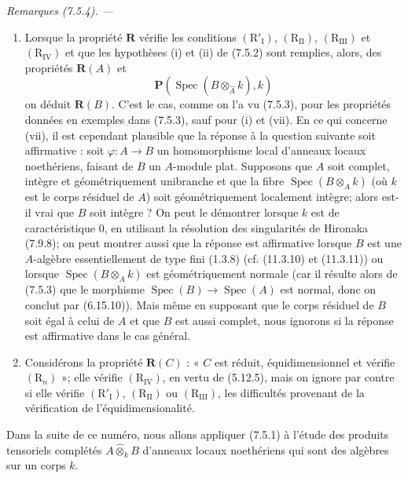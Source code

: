 \documentclass[10pt,oneside]{book}
\newcommand{\oldpage}[2][]{%
  \setcounter{footnote}{0}%
  \marginpar{\scriptsize\textbf{#1}~|~#2}\ignorespaces}
\newenvironment{remarks}[1][]{%
  \par\medskip\noindent\itshape Remarques (#1). ---\ }{\par}
\begin{document}
\begin{remarks}[7.5.4]
\begin{enumerate}
\item[\emph{(iii)}] Lorsque la propriété $\boldsymbol R$ vérifie les conditions
$(\mathrm R'_{\mathrm I})$, $(\mathrm R_{\mathrm{II}})$,
$(\mathrm R_{\mathrm{III}})$ et $(\mathrm R_{\mathrm{IV}})$ et que les
hypothèses (i) et (ii) de (7.5.2) sont remplies, alors, des propriétés
$\boldsymbol R(A)$ et
\[
\boldsymbol P(\operatorname{Spec}(\widehat B
\otimes_{\widehat A}k),k)
\]
on déduit $\boldsymbol R(B)$. C'est le cas, comme on l'a vu (7.5.3), pour les
propriétés données en exemples dans (7.5.3), sauf pour (i) et (vii). En ce qui
concerne (vii), il est cependant plausible que la réponse à la question
suivante soit affirmative : soit $\varphi:A\to B$ un homomorphisme local
d'anneaux locaux noethériens, faisant de $B$ un $A$-module plat. Supposons que
$A$ soit complet, intègre et géométriquement unibranche et que la fibre
$\operatorname{Spec}(B\otimes_A k)$ (où $k$ est le corps résiduel de $A$) soit
géométriquement localement intègre; alors est-il vrai que $B$ soit intègre ?
On peut le démontrer lorsque $k$ est de caractéristique 0, en utilisant la
résolution des singularités de Hironaka (7.9.8); on peut montrer aussi que la
réponse est affirmative lorsque $B$ est une $A$-algèbre essentiellement de
type fini (1.3.8) (cf. (11.3.10) et (11.3.11)) ou lorsque
$\operatorname{Spec}(B\otimes_A k)$ est géométriquement normale (car il résulte
alors de (7.5.3) que le morphisme
$\operatorname{Spec}(B)\to\operatorname{Spec}(A)$ est normal, donc on conclut
par (6.15.10)). Mais même en supposant que le corps résiduel de $B$ soit égal
à celui de $A$ et que $B$ est aussi complet, nous ignorons si la réponse est
affirmative dans le cas général.

\item[\emph{(iv)}] Considérons la propriété $\boldsymbol R(C)$ : « $C$ est
réduit, équidimensionnel et vérifie $(\mathrm R_n)$ »; elle vérifie
$(\mathrm R_{\mathrm{IV}})$, en vertu de (5.12.5), mais on ignore par contre si
elle vérifie $(\mathrm R'_{\mathrm I})$, $(\mathrm R_{\mathrm{II}})$ ou
$(\mathrm R_{\mathrm{III}})$, les difficultés provenant de la vérification de
l'équidimensionalité.
\end{enumerate}
\end{remarks}

\oldpage[IV-2]{207}

Dans la suite de ce numéro, nous allons appliquer (7.5.1) à l'étude des
produits tensoriels complétés $A\widehat\otimes_k B$ d'anneaux locaux
noethériens qui sont des algèbres sur un corps $k$.
\end{document}
